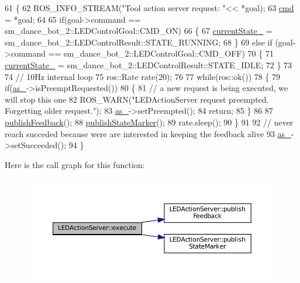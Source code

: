 \begin{DoxyCode}
61 \{
62   ROS\_INFO\_STREAM(\textcolor{stringliteral}{"Tool action server request: "}<< *goal);
63   \hyperlink{classLEDActionServer_a4d3a4c07e7659cdd78228932bb1634d3}{cmd} = *goal;
64 
65   \textcolor{keywordflow}{if}(goal->command == sm\_dance\_bot\_2::LEDControlGoal::CMD\_ON)
66   \{
67     \hyperlink{classLEDActionServer_a1dc456e987dc331501ad6ff2215661ff}{currentState\_} =  sm\_dance\_bot\_2::LEDControlResult::STATE\_RUNNING;
68   \}
69   \textcolor{keywordflow}{else}  \textcolor{keywordflow}{if} (goal->command == sm\_dance\_bot\_2::LEDControlGoal::CMD\_OFF)
70   \{
71     \hyperlink{classLEDActionServer_a1dc456e987dc331501ad6ff2215661ff}{currentState\_} =  sm\_dance\_bot\_2::LEDControlResult::STATE\_IDLE;
72   \}
73 
74   \textcolor{comment}{// 10Hz internal loop}
75   ros::Rate rate(20);
76 
77   \textcolor{keywordflow}{while}(ros::ok())
78   \{
79     \textcolor{keywordflow}{if}(\hyperlink{classLEDActionServer_a61d21c77642081acf017d4ebd65b2de0}{as\_}->isPreemptRequested())
80     \{
81        \textcolor{comment}{// a new request is being executed, we will stop this one}
82        ROS\_WARN(\textcolor{stringliteral}{"LEDActionServer request preempted. Forgetting older request."});
83        \hyperlink{classLEDActionServer_a61d21c77642081acf017d4ebd65b2de0}{as\_}->setPreempted(); 
84        \textcolor{keywordflow}{return};
85     \}
86     
87     \hyperlink{classLEDActionServer_a25c93d4e7ecdacbb4f5b090d7789aa36}{publishFeedback}();
88     \hyperlink{classLEDActionServer_a73bb754ac2347c50660624ad92315895}{publishStateMarker}();
89     rate.sleep();
90   \}
91 
92    \textcolor{comment}{// never reach succeded because were are interested in keeping the feedback alive}
93    \hyperlink{classLEDActionServer_a61d21c77642081acf017d4ebd65b2de0}{as\_}->setSucceeded();
94 \}
\end{DoxyCode}
Here is the call graph for this function\+:
\nopagebreak
\begin{figure}[H]
\begin{center}
\leavevmode
\includegraphics[width=350pt]{classLEDActionServer_ae7cf81f53d16e3bdb5142df60b2017b3_cgraph}
\end{center}
\end{figure}
\mbox{\label{classLEDActionServer_a25c93d4e7ecdacbb4f5b090d7789aa36}} 
